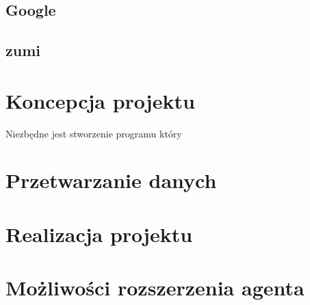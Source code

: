 \documentclass[a4 122pt]{article}
\begin{document}
			\subsection{Google}
			
			\subsection{zumi}
			
	\section{Koncepcja projektu}
	
		Niezbędne jest stworzenie programu który
		
	\section{Przetwarzanie danych}
	
	\section{Realizacja projektu}
	
	\section{Możliwości rozszerzenia agenta}
\end{document}
